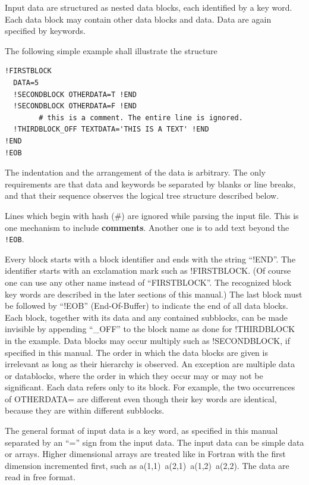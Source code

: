 \documentclass[final,12pt]{article}
\begin{document}
Input data are structured as nested data blocks, each identified
by a key word. Each data block may contain other data blocks and
data. Data are again specified by keywords.

The following simple example shall illustrate the structure 
\begin{verbatim}
!FIRSTBLOCK
  DATA=5
  !SECONDBLOCK OTHERDATA=T !END
  !SECONDBLOCK OTHERDATA=F !END
        # this is a comment. The entire line is ignored.
  !THIRDBLOCK_OFF TEXTDATA='THIS IS A TEXT' !END
!END
!EOB
\end{verbatim}
The indentation and the arrangement of the data is arbitrary. The only
requirements are that data and keywords be separated by blanks or
line breaks, and that their sequence observes the logical tree structure
described below.

Lines which begin with hash ($\#$) are ignored while parsing the input
file. This is one mechanism to include
\textbf{comments}. Another one is to add
text beyond the \verb|!EOB|.

Every block starts with a block identifier and ends with the string
``!END''.  The identifier starts with an exclamation mark such as
!FIRSTBLOCK. (Of course one can use any other name instead of
``FIRSTBLOCK''. The recognized block key words are described in the
later sections of this manual.) The last block must be followed by
``!EOB'' (End-Of-Buffer) to indicate the end of all data blocks. Each
block, together with its data and any contained subblocks, can be
made invisible by appending ``\_OFF'' to the block name as done for
!THIRDBLOCK in the example. Data blocks may occur multiply such as
!SECONDBLOCK, if specified in this manual. The order in which the data
blocks are given is irrelevant as long as their hierarchy is observed.
An exception are multiple data or datablocks, where the order in
which they occur may or may not be significant.  Each data refers
only to its block. For example, the two occurrences of OTHERDATA=
are different even though their key words are identical, because they
are within different subblocks.

The general format of input data is a key word, as specified in this
manual separated by an ``='' sign from the input data.  The input data
can be simple data or arrays. Higher dimensional arrays are treated
like in Fortran with the first dimension incremented first, such as
a(1,1)\ a(2,1)\ a(1,2)\ a(2,2). The data are read in free format.
\end{document}
